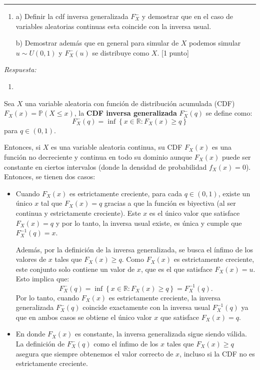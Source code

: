 \vspace{5mm}
{\color{lightgray} \hrule}
\begin{enumerate}
	\item a) Definir la cdf inversa generalizada $F_{X}^{-}$ y demostrar que en el caso de variables aleatorias continuas esta coincide con la inversa usual.
	
	b) Demostrar además que en general para simular de $X$ podemos simular $u\sim U(0,1)$ y $F_{X}^{-} (u)$ se distribuye como $X$. [1 punto]
\end{enumerate}

\textcolor{BrickRed}{\it Respuesta:}

{\color{blue}
	\begin{enumerate}[label=\alph*), start=1]
		\item  
\end{enumerate}}
Sea $X$ una variable aleatoria con función de distribución acumulada (CDF) $F_{X}(x) =  \mathbb{P} \left(X\leq x\right)$, la \textbf{CDF inversa generalizada} $F_{X}^{-} (q)$ se define como:
\begin{equation}
	F_{X}^{-} (q) = \inf\left\{ x\in\mathbb{R} : F_{X}(x) \geq q \right\}
\end{equation}
para $q \in (0,1)$.

Entonces, si $X$ es una variable aleatoria continua, su CDF $F_{X}(x)$ es una función no decreciente y continua en todo su dominio aunque $F_{X}(x)$ puede ser constante en ciertos intervalos (donde la densidad de probabilidad $f_{X}(x)=0$). Entonces, se tienen dos casos:
\begin{itemize}
	\item Cuando $F_{X}(x)$ es estrictamente creciente, para cada $q\in(0,1)$, existe un único $x$ tal que $F_{X}(x)=q$ gracias a que la función es biyectiva (al ser continua y estrictamente creciente). Este $x$ es el único valor que satisface $F_{X}(x)=q$ y por lo tanto, la inversa usual existe, es única y cumple que $F_{X}^{-1}(q)=x$.
	
	Además, por la definición de la inversa generalizada, se busca el ínfimo de los valores de $x$ tales que $F_{X}(x)\geq q$. Como $F_{X}(x)$ es estrictamente creciente, este conjunto solo contiene un valor de $x$, que es el que satisface $F_{X}(x)=u$. Esto implica que:
	\begin{equation}
		F_{X}^{-}(q) = \inf\left\{ x\in\mathbb{R} : F_{X}(x) \geq q \right\} = F_{X}^{-1}(q).
	\end{equation}
	Por lo tanto, cuando $F_{X}(x)$ es estrictamente creciente, la inversa generalizada $F_{X}^{-}(q)$ coincide exactamente con la inversa usual $F_{X}^{-1}(q)$  ya que en ambos casos se obtiene el único valor $x$ que satisface $F_{X}(x) = q$.
	
	\item En donde $F_{X}(x)$ es constante, la inversa generalizada sigue siendo válida. La definición de $F_{X}^{-}(q)$ como el ínfimo de los $x$ tales que $F_{X}(x)\geq q$ asegura que siempre obtenemos el valor correcto de $x$, incluso si la CDF no es estrictamente creciente.
\end{itemize}

